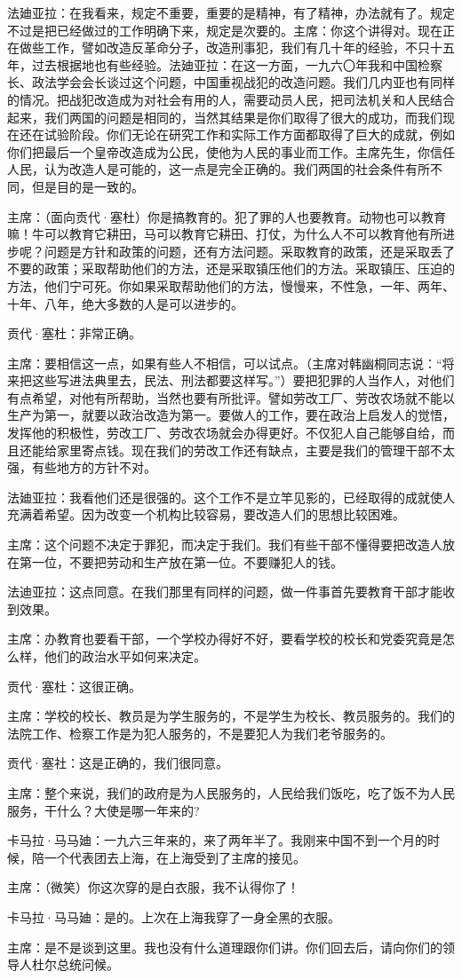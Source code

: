 法廸亚拉：在我看来，规定不重要，重要的是精神，有了精神，办法就有了。规定不过是把已经做过的工作明确下来，规定是次要的。主席：你这个讲得对。现在正在做些工作，譬如改造反革命分子，改造刑事犯，我们有几十年的经验，不只十五年，过去根据地也有些经验。法廸亚拉：在这一方面，一九六〇年我和中国检察长、政法学会会长谈过这个问题，中国重视战犯的改造问题。我们几内亚也有同样的情况。把战犯改造成为对社会有用的人，需要动员人民，把司法机关和人民结合起来，我们两国的问题是相同的，当然其结果是你们取得了很大的成功，而我们现在还在试验阶段。你们无论在研究工作和实际工作方面都取得了巨大的成就，例如你们把最后一个皇帝改造成为公民，使他为人民的事业而工作。主席先生，你信任人民，认为改造人是可能的，这一点是完全正确的。我们两国的社会条件有所不同，但是目的是一致的。

主席：（面向贡代·塞杜）你是搞教育的。犯了罪的人也要教育。动物也可以教育嘛！牛可以教育它耕田，马可以教育它耕田、打仗，为什么人不可以教育他有所进步呢？问题是方针和政策的问题，还有方法问题。采取教育的政策，还是采取丢了不要的政策；采取帮助他们的方法，还是采取镇压他们的方法。采取镇压、压迫的方法，他们宁可死。你如果采取帮助他们的方法，慢慢来，不性急，一年、两年、十年、八年，绝大多数的人是可以进步的。

贡代·塞杜：非常正确。

主席：要相信这一点，如果有些人不相信，可以试点。（主席对韩幽桐同志说：“将来把这些写进法典里去，民法、刑法都要这样写。”）要把犯罪的人当作人，对他们有点希望，对他有所帮助，当然也要有所批评。譬如劳改工厂、劳改农场就不能以生产为第一，就要以政治改造为第一。要做人的工作，要在政治上启发人的觉悟，发挥他的积极性，劳改工厂、劳改农场就会办得更好。不仅犯人自己能够自给，而且还能给家里寄点钱。现在我们的劳改工作还有缺点，主要是我们的管理干部不太强，有些地方的方针不对。

法廸亚拉：我看他们还是很强的。这个工作不是立竿见影的，已经取得的成就使人充满着希望。因为改变一个机构比较容易，要改造人们的思想比较困难。

主席：这个问题不决定于罪犯，而决定于我们。我们有些干部不懂得要把改造人放在第一位，不要把劳动和生产放在第一位。不要赚犯人的钱。

法迪亚拉：这点同意。在我们那里有同样的问题，做一件事首先要教育干部才能收到效果。

主席：办教育也要看干部，一个学校办得好不好，要看学校的校长和党委究竟是怎么样，他们的政治水平如何来决定。

贡代·塞杜：这很正确。

主席：学校的校长、教员是为学生服务的，不是学生为校长、教员服务的。我们的法院工作、检察工作是为犯人服务的，不是要犯人为我们老爷服务的。

贡代·塞社：这是正确的，我们很同意。

主席：整个来说，我们的政府是为人民服务的，人民给我们饭吃，吃了饭不为人民服务，干什么？大使是哪一年来的?

卡马拉·马马廸：一九六三年来的，来了两年半了。我刚来中国不到一个月的时候，陪一个代表团去上海，在上海受到了主席的接见。

主席：（微笑）你这次穿的是白衣服，我不认得你了！

卡马拉·马马廸：是的。上次在上海我穿了一身全黑的衣服。

主席：是不是谈到这里。我也没有什么道理跟你们讲。你们回去后，请向你们的领导人杜尔总统问候。

